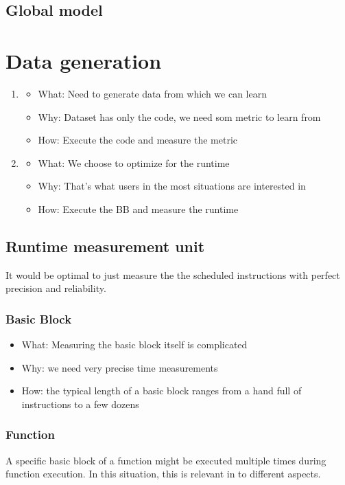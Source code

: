 \subsection{Global model}
\label{subsec:approach:ml:global}

\section{Data generation}
\begin{enumerate}
    \item 
    \begin{itemize}
        \item What: Need to generate data from which we can learn
        \item Why: Dataset has only the code, we need som metric to learn from
        \item How: Execute the code and measure the metric
    \end{itemize}
    \item
    \begin{itemize}
        \item What: We choose to optimize for the runtime
        \item Why: That's what users in the most situations are interested in
        \item How: Execute the BB and measure the runtime
    \end{itemize}
\end{enumerate}

\subsection{Runtime measurement unit}
It would be optimal to just measure the the scheduled instructions with perfect precision and reliability.
\subsubsection{Basic Block}
\begin{itemize}
    \item What: Measuring the basic block itself is complicated
    \item Why: we need very precise time measurements
    \item How: the typical length of a basic block ranges from a hand full of instructions to a few dozens
\end{itemize}
\subsubsection{Function}
\label{sec:approach:datageneration:runtime:function}
A specific basic block of a function might be executed multiple times during function execution.
In this situation, this is relevant in to different aspects.

